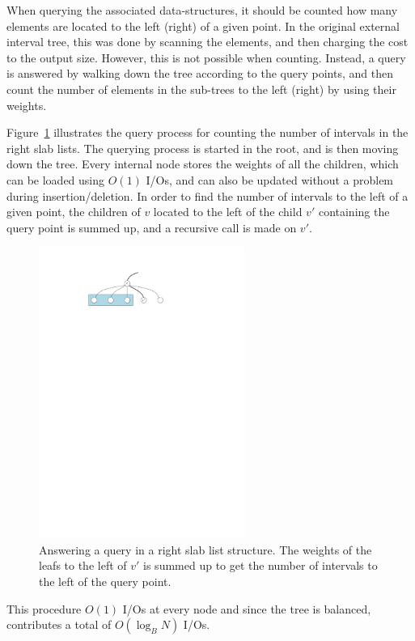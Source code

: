 \documentclass[a4paper,12pt]{article}
\begin{document}
When querying the associated data-structures, it should be counted how many elements are located to the left (right) of a given point. In the original external interval tree, this was done by scanning the elements, and then charging the cost to the output size. However, this is not possible when counting. Instead, a query is answered by walking down the tree according to the query points, and then count the number of elements in the sub-trees to the left (right) by using their weights.

Figure~\ref{fig:searching:query} illustrates the query process for counting the number of intervals in the right slab lists. The querying process is started in the root, and is then moving down the tree. Every internal node stores the weights of all the children, which can be loaded using $O(1)$ I/Os, and can also be updated without a problem during insertion/deletion. In order to find the number of intervals to the left of a given point, the children of $v$ located to the left of the child $v'$ containing the query point is summed up, and a recursive call is made on $v'$.
\begin{figure}[h!]
  \centering
  \includegraphics[width=0.6\textwidth]{images/query}
  \caption{Answering a query in a right slab list structure. The weights of the leafs to the left of $v'$ is summed up to get the number of intervals to the left of the query point.}
  \label{fig:searching:query}
\end{figure}
This procedure $O(1)$ I/Os at every node and since the tree is balanced, contributes a total of $O(\log_B N)$ I/Os.
\end{document}
